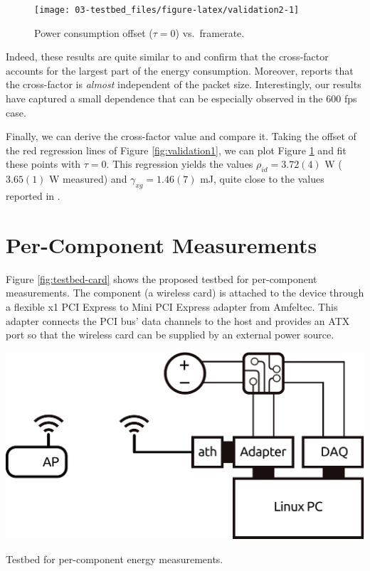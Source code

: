 \documentclass[twoside,nohyper]{tufte-book}
\begin{document}
\begin{figure}[b]

{\centering \texttt{[image: 03-testbed\_files/figure-latex/validation2-1]} 

}

\caption[Power consumption offset (\(\tau=0\)) vs.~framerate.]{Power consumption offset (\(\tau=0\)) vs.~framerate.}\label{fig:validation2}
\end{figure}

Indeed, these results are quite similar to \citet{Serrano2014} and confirm that the cross-factor accounts for the largest part of the energy consumption. Moreover, \citet{Serrano2014} reports that the cross-factor is \emph{almost} independent of the packet size. Interestingly, our results have captured a small dependence that can be especially observed in the 600 fps case.

Finally, we can derive the cross-factor value and compare it. Taking the offset of the red regression lines of Figure \ref{fig:validation1}, we can plot Figure \ref{fig:validation2} and fit these points with \(\tau=0\). This regression yields the values \(\rho_{id}=3.72(4)\) W (\(3.65(1)\) W measured) and \(\gamma_{xg}=1.46(7)\) mJ, quite close to the values reported in \citet{Serrano2014}.

\hypertarget{per-component-measurements}{%
\section{Per-Component Measurements}\label{per-component-measurements}}

Figure \ref{fig:testbed-card} shows the proposed testbed for per-component measurements. The component (a wireless card) is attached to the device through a flexible x1 PCI Express to Mini PCI Express adapter from Amfeltec. This adapter connects the PCI bus' data channels to the host and provides an ATX port so that the wireless card can be supplied by an external power source.



\begin{marginfigure}

{\centering \includegraphics[width=1\linewidth]{img/03/testbed-card} 

}

\caption[Testbed for per-component energy measurements.]{Testbed for per-component energy measurements.}\label{fig:testbed-card}
\end{marginfigure}
\end{document}
